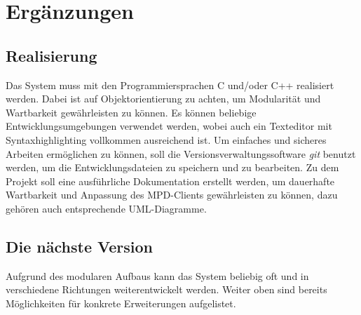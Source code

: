 \section{Ergänzungen}
\subsection{Realisierung}
Das System muss mit den Programmiersprachen C und/oder C++ realisiert werden. Dabei ist auf
Objektorientierung zu achten, um Modularität und Wartbarkeit gewährleisten zu können.
Es können beliebige Entwicklungsumgebungen verwendet werden, wobei auch ein Texteditor mit Syntaxhighlighting vollkommen ausreichend ist.
Um einfaches und sicheres Arbeiten ermöglichen zu können, soll die Versionsverwaltungssoftware \emph{git} benutzt werden, um die
Entwicklungsdateien zu speichern und zu bearbeiten. Zu dem Projekt soll eine ausführliche
Dokumentation erstellt werden, um dauerhafte Wartbarkeit und Anpassung des MPD-Clients gewährleisten
zu können, dazu gehören auch entsprechende UML-Diagramme. 
\subsection{Die nächste Version}
Aufgrund des modularen Aufbaus kann das System beliebig oft und in verschiedene Richtungen weiterentwickelt werden.
Weiter oben sind bereits Möglichkeiten für konkrete Erweiterungen aufgelistet.
